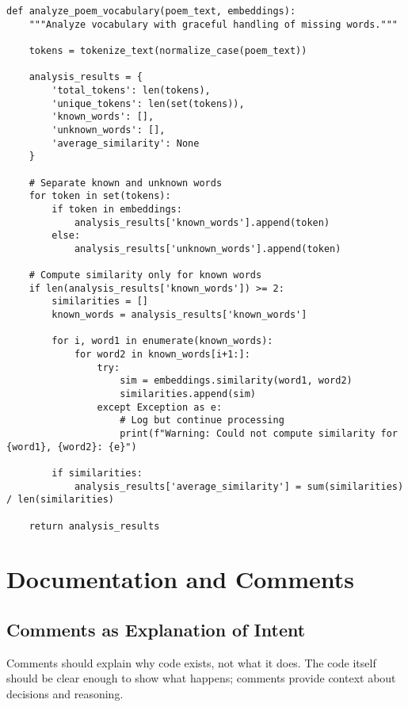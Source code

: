 \documentclass[11pt,a4paper]{article}
\begin{document}
\begin{lstlisting}[caption=Graceful degradation with partial results]
def analyze_poem_vocabulary(poem_text, embeddings):
    """Analyze vocabulary with graceful handling of missing words."""
    
    tokens = tokenize_text(normalize_case(poem_text))
    
    analysis_results = {
        'total_tokens': len(tokens),
        'unique_tokens': len(set(tokens)),
        'known_words': [],
        'unknown_words': [],
        'average_similarity': None
    }
    
    # Separate known and unknown words
    for token in set(tokens):
        if token in embeddings:
            analysis_results['known_words'].append(token)
        else:
            analysis_results['unknown_words'].append(token)
    
    # Compute similarity only for known words
    if len(analysis_results['known_words']) >= 2:
        similarities = []
        known_words = analysis_results['known_words']
        
        for i, word1 in enumerate(known_words):
            for word2 in known_words[i+1:]:
                try:
                    sim = embeddings.similarity(word1, word2)
                    similarities.append(sim)
                except Exception as e:
                    # Log but continue processing
                    print(f"Warning: Could not compute similarity for {word1}, {word2}: {e}")
        
        if similarities:
            analysis_results['average_similarity'] = sum(similarities) / len(similarities)
    
    return analysis_results
\end{lstlisting}

\section{Documentation and Comments}

\subsection{Comments as Explanation of Intent}

Comments should explain why code exists, not what it does. The code itself should be clear enough to show what happens; comments provide context about decisions and reasoning.
\end{document}
